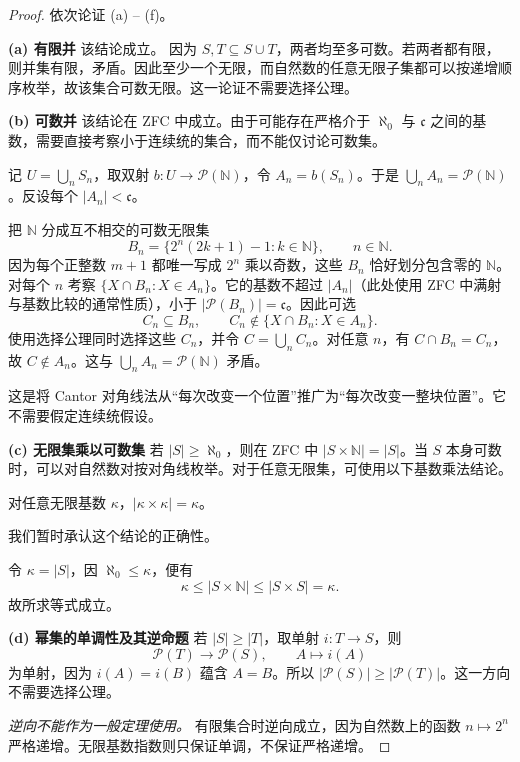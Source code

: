 \documentclass[lang=cn,a4paper,fontset=none,zihao=false,10pt,openany,twoside]{beautybook}
\numberwithin{algorithm}{chapter}
\newcommand{\N}{\mathbb N}
\newcommand{\Pow}{\mathcal P}
\begin{document}
\begin{proof}
依次论证 (a) -- (f)。

\par\smallskip\noindent\textbf{(a) 有限并}\quad 
该结论成立。
因为 $S,T\subseteq S\cup T$，两者均至多可数。若两者都有限，则并集有限，矛盾。因此至少一个无限，而自然数的任意无限子集都可以按递增顺序枚举，故该集合可数无限。这一论证不需要选择公理。

\par\smallskip\noindent\textbf{(b) 可数并}\quad 
该结论在 ZFC 中成立。由于可能存在严格介于 $\aleph_0$ 与 $\mathfrak c$ 之间的基数，需要直接考察小于连续统的集合，而不能仅讨论可数集。

记 $U=\bigcup_nS_n$，取双射 $b:U\to\Pow(\N)$，令 $A_n=b(S_n)$。于是 $\bigcup_n A_n=\Pow(\N)$。反设每个 $|A_n|<\mathfrak c$。

把 $\N$ 分成互不相交的可数无限集
\[
 B_n=\{2^n(2k+1)-1:k\in\N\},\qquad n\in\N.
\]
因为每个正整数 $m+1$ 都唯一写成 $2^n$ 乘以奇数，这些 $B_n$ 恰好划分包含零的 $\N$。
对每个 $n$ 考察 $\{X\cap B_n:X\in A_n\}$。它的基数不超过 $|A_n|$（此处使用 ZFC 中满射与基数比较的通常性质），小于 $|\Pow(B_n)|=\mathfrak c$。因此可选
\[
 C_n\subseteq B_n,\qquad C_n\notin\{X\cap B_n:X\in A_n\}.
\]
使用选择公理同时选择这些 $C_n$，并令 $C=\bigcup_nC_n$。对任意 $n$，有 $C\cap B_n=C_n$，故 $C\notin A_n$。这与 $\bigcup_nA_n=\Pow(\N)$ 矛盾。

这是将 Cantor 对角线法从“每次改变一个位置”推广为“每次改变一整块位置”。它不需要假定连续统假设。
\par\smallskip\noindent\textbf{(c) 无限集乘以可数集}\quad 
若 $|S|\geq\aleph_0$，则在 ZFC 中 $|S\times\N|=|S|$。当 $S$ 本身可数时，可以对自然数对按对角线枚举。对于任意无限集，可使用以下基数乘法结论。

\begin{lemma}
对任意无限基数 $\kappa$，$|\kappa\times\kappa|=\kappa$。
\end{lemma}

我们暂时承认这个结论的正确性。

令 $\kappa=|S|$，因 $\aleph_0\leq\kappa$，便有
\[
 \kappa\leq|S\times\N|\leq|S\times S|=\kappa.
\]
故所求等式成立。
\par\smallskip\noindent\textbf{(d) 幂集的单调性及其逆命题}\quad 
若 $|S|\geq|T|$，取单射 $i:T\to S$，则
\[
 \Pow(T)\longrightarrow\Pow(S),\qquad A\longmapsto i(A)
\]
为单射，因为 $i(A)=i(B)$ 蕴含 $A=B$。所以 $|\Pow(S)|\geq|\Pow(T)|$。这一方向不需要选择公理。

\emph{逆向不能作为一般定理使用。}
有限集合时逆向成立，因为自然数上的函数 $n\mapsto2^n$ 严格递增。无限基数指数则只保证单调，不保证严格递增。


\end{proof}
\end{document}
